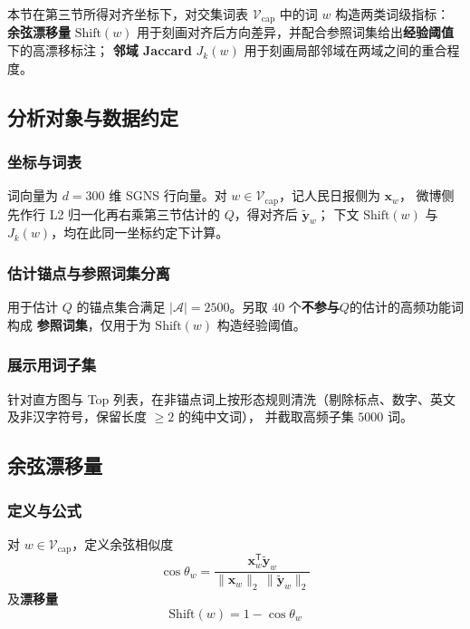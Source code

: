 \documentclass[withoutpreface]{cumcmthesis}
\begin{document}
本节在第三节所得对齐坐标下，对交集词表 $\mathcal{V}_{\mathrm{cap}}$ 中的词 $w$ 构造两类词级指标：
\textbf{余弦漂移量} $\mathrm{Shift}(w)$ 用于刻画对齐后方向差异，并配合参照词集给出\textbf{经验阈值}下的高漂移标注；
\textbf{邻域 Jaccard} $J_k(w)$ 用于刻画局部邻域在两域之间的重合程度。

\subsection{分析对象与数据约定}

\subsubsection{坐标与词表}
词向量为 $d=300$ 维 SGNS 行向量。对 $w\in\mathcal{V}_{\mathrm{cap}}$，记人民日报侧为 $\mathbf{x}_w$，
微博侧先作行 L2 归一化再右乘第三节估计的 $Q$，得对齐后 $\tilde{\mathbf{y}}_w$；
下文 $\mathrm{Shift}(w)$ 与 $J_k(w)$，均在此同一坐标约定下计算。

\subsubsection{估计锚点与参照词集分离}
用于估计 $Q$ 的锚点集合满足 $|\mathcal{A}|=2500$。另取 $40$ 个\textbf{不参与}$Q$的估计的高频功能词构成
\textbf{参照词集}，仅用于为 $\mathrm{Shift}(w)$ 构造经验阈值。

\subsubsection{展示用词子集}
针对直方图与 Top 列表，在非锚点词上按形态规则清洗（剔除标点、数字、英文及非汉字符号，保留长度 $\geq2$ 的纯中文词），
并截取高频子集 $5000$ 词。

\subsection{余弦漂移量}

\subsubsection{定义与公式}
对 $w\in\mathcal{V}_{\mathrm{cap}}$，定义余弦相似度
\begin{equation}
  \cos\theta_w
  = \frac{\mathbf{x}_w^{\mathsf{T}}\tilde{\mathbf{y}}_w}{\|\mathbf{x}_w\|_2\,\|\tilde{\mathbf{y}}_w\|_2}
\end{equation}
及\textbf{漂移量}
\begin{equation}
  \mathrm{Shift}(w)=1-\cos\theta_w 
\end{equation}
\end{document}
